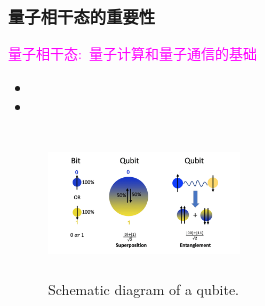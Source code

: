 \begin{frame}
    \frametitle{量子相干态的重要性}
    \textcolor{magenta}{量子相干态:~量子计算和量子通信的基础}
    \begin{itemize}
        \item {\fontsize{8.5pt}{5.2pt}\selectfont{量子计算:~并行计算正是利用相干态的叠加特性实现的}}
	\item {\fontsize{8.5pt}{5.2pt}\selectfont{量子信息处理:~相干态的保持可确保信息的准确传输和处理}}
    \end{itemize}
{\fontsize{7.5pt}{5.2pt}}
            \begin{figure}
        \centering
                \includegraphics[height=1.5in, width=2.0in, viewport=0 0 460 380,clip]{Figures/Illustration-of-a-bit_and_qubit.png}
		\caption{\tiny{\textrm{Schematic diagram of a qubite.}}}
		\label{Fig:Schematic-Coherence-of-particle_2}
            \end{figure}
\end{frame}

